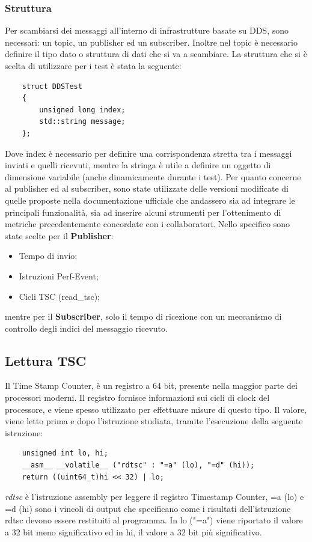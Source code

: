 \subsubsection*{Struttura}

Per scambiarsi dei messaggi all'interno di infrastrutture basate su DDS, sono necessari: un topic, un publisher ed un subscriber. Inoltre nel topic è necessario definire il tipo dato o struttura di dati che si va a scambiare. La struttura che si è scelta di utilizzare per i test è stata la seguente:
\begin{verbatim}
    struct DDSTest
    {
        unsigned long index;
        std::string message;
    };
\end{verbatim}
Dove index è necessario per definire una corrispondenza stretta tra i messaggi inviati e quelli ricevuti, mentre la stringa è utile a definire un oggetto di dimensione variabile (anche dinamicamente durante i test).
Per quanto concerne al publisher ed al subscriber, sono state utilizzate delle versioni modificate di quelle proposte nella documentazione ufficiale \cite{FastDDS} che andassero sia ad integrare le principali funzionalità, sia ad inserire alcuni strumenti per l'ottenimento di metriche precedentemente concordate con i collaboratori. Nello specifico sono state scelte per il \textbf{Publisher}:
\begin{itemize}
    \item Tempo di invio;
    \item Istruzioni Perf-Event;
    \item Cicli TSC (read\_tsc);
\end{itemize}
mentre per il \textbf{Subscriber}, solo il tempo di ricezione con un meccanismo di controllo degli indici del messaggio ricevuto.
\subsection{Lettura TSC}
Il Time Stamp Counter, è un registro a 64 bit, presente nella maggior parte dei processori moderni. Il registro fornisce informazioni sui cicli di clock del processore, e viene spesso utilizzato per effettuare misure di questo tipo. Il valore, viene letto prima e dopo l'istruzione studiata, tramite l'esecuzione della seguente istruzione:
\begin{verbatim}
    unsigned int lo, hi;
    __asm__ __volatile__ ("rdtsc" : "=a" (lo), "=d" (hi));
    return ((uint64_t)hi << 32) | lo; 
\end{verbatim}
\emph{rdtsc} è l'istruzione assembly per leggere il registro Timestamp Counter, =a (lo) e =d (hi) sono i vincoli di output che specificano come i risultati dell'istruzione rdtsc devono essere restituiti al programma. In lo ("=a") viene riportato il valore a 32 bit meno significativo ed in hi, il valore a 32 bit più significativo.

